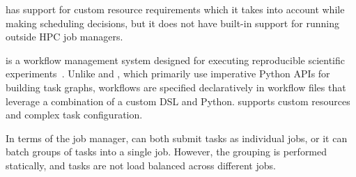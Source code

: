 \ray{} has support for custom resource requirements which it takes into account while making
scheduling decisions, but it does not have built-in support for running outside HPC job managers.

\snakemake{} is a workflow management system designed for executing reproducible
scientific experiments~\cite{snakemake}. Unlike \dask{} and \ray{}, which primarily use
imperative Python APIs for building task graphs, \snakemake{} workflows are specified declaratively
in workflow files that leverage a combination of a custom DSL and Python. \snakemake{} supports
custom resources and complex task configuration.

In terms of the job manager, \snakemake{} can both submit tasks as individual jobs, or it can
batch groups of tasks into a single job. However, the grouping is performed statically, and tasks
are not load balanced across different jobs.

